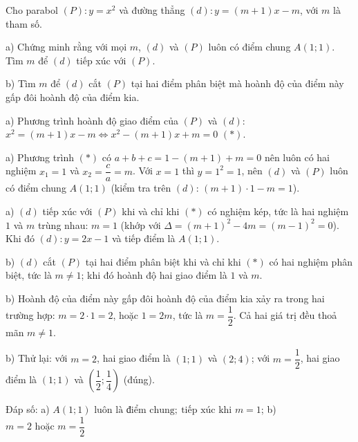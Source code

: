\begin{problem}[9DS-HSB2-016]
Cho parabol $(P)\colon y = x^2$ và đường thẳng $(d)\colon y = (m + 1)x - m$, với $m$ là tham số.

a) Chứng minh rằng với mọi $m$, $(d)$ và $(P)$ luôn có điểm chung $A(1; 1)$. Tìm $m$ để $(d)$ tiếp xúc với $(P)$.

b) Tìm $m$ để $(d)$ cắt $(P)$ tại hai điểm phân biệt mà hoành độ của điểm này gấp đôi hoành độ của điểm kia.

\begin{solution}
a) Phương trình hoành độ giao điểm của $(P)$ và $(d)$: $x^2 = (m + 1)x - m \Leftrightarrow x^2 - (m + 1)x + m = 0$ $(*)$.

a) Phương trình $(*)$ có $a + b + c = 1 - (m + 1) + m = 0$ nên luôn có hai nghiệm $x_1 = 1$ và $x_2 = \dfrac{c}{a} = m$. Với $x = 1$ thì $y = 1^2 = 1$, nên $(d)$ và $(P)$ luôn có điểm chung $A(1; 1)$ (kiểm tra trên $(d)$: $(m + 1) \cdot 1 - m = 1$).

a) $(d)$ tiếp xúc với $(P)$ khi và chỉ khi $(*)$ có nghiệm kép, tức là hai nghiệm $1$ và $m$ trùng nhau: $m = 1$ (khớp với $\Delta = (m + 1)^2 - 4m = (m - 1)^2 = 0$). Khi đó $(d)\colon y = 2x - 1$ và tiếp điểm là $A(1; 1)$.

b) $(d)$ cắt $(P)$ tại hai điểm phân biệt khi và chỉ khi $(*)$ có hai nghiệm phân biệt, tức là $m \neq 1$; khi đó hoành độ hai giao điểm là $1$ và $m$.

b) Hoành độ của điểm này gấp đôi hoành độ của điểm kia xảy ra trong hai trường hợp: $m = 2 \cdot 1 = 2$, hoặc $1 = 2m$, tức là $m = \dfrac{1}{2}$. Cả hai giá trị đều thoả mãn $m \neq 1$.

b) Thử lại: với $m = 2$, hai giao điểm là $(1; 1)$ và $(2; 4)$; với $m = \dfrac{1}{2}$, hai giao điểm là $(1; 1)$ và $\left(\dfrac{1}{2}; \dfrac{1}{4}\right)$ (đúng).

Đáp số: a) $\boxed{A(1; 1) \text{ luôn là điểm chung};\ \text{tiếp xúc khi } m = 1}$; b) $\boxed{m = 2 \text{ hoặc } m = \dfrac{1}{2}}$
\end{solution}
\end{problem}

